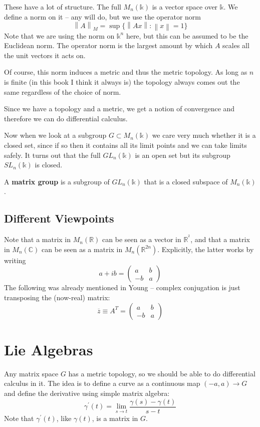 \documentclass[oneside,english]{amsbook}
\numberwithin{section}{chapter}
\theoremstyle{plain}
\theoremstyle{definition}
\newcommand{\norm}[1]{\left\lVert#1\right\rVert}
\begin{document}
These have a lot of structure. The full $M_n(\mathbb{k})$ is a vector space over $\mathbb{k}$. We define a norm on it -- any will do, but we use the operator norm
\[
	\norm{A}_M = \sup{\{\norm{Ax} : \norm{x} = 1 \}}
\]
Note that we are using the norm on $\mathbb{k}^n$ here, but this can be assumed to be the Euclidean norm. The operator norm is the largest amount by which $A$ scales all the unit vectors it acts on.

Of course, this norm induces a metric and thus the metric topology. As long as $n$ is finite (in this book I think it always is) the topology always comes out the same regardless of the choice of norm. 

Since we have a topology and a metric, we get a notion of convergence and therefore we can do differential calculus. 

Now when we look at a subgroup $G\subset M_n(\mathbb{k})$ we care very much whether it is a closed set, since if so then it contains all its limit points and we can take limits safely. It turns out that the full $GL_n(\mathbb{k})$ is an open set but its subgroup $SL_n(\mathbb{k})$ is closed.

A \textbf{matrix group} is a subgroup of $GL_n(\mathbb{k})$ that is a closed subspace of $M_n(\mathbb{k})$. 



\subsection{Different Viewpoints}

Note that a matrix in $M_n(\mathbb{R})$ can be seen as a vector in $\mathbb{R}^{^2}$, and that a matrix in $M_n(\mathbb{C})$ can be seen as a matrix in $M_n(\mathbb{R}^{2n})$. Explicitly, the latter works by writing
\[
	a + ib = \begin{pmatrix} a & b \\ -b & a \end{pmatrix}
\]
The following was already mentioned in Young -- complex conjugation is just transposing the (now-real) matrix:
\[
\overline{z} \equiv A^T = \begin{pmatrix} a & b \\ -b & a \end{pmatrix}
\]

\section{Lie Algebras}

Any matrix space $G$ has a metric topology, so we should be able to do differential calculus in it. The idea is to define a curve as a continuous map $(-a, a)\to G$ and define the derivative using simple matrix algebra:
\[
	\gamma^\prime(t) = \lim_{s\to t} \frac{\gamma(s) - \gamma(t)}{s-t}
\]
Note that $\gamma^\prime(t)$, like $\gamma(t)$, is a matrix in $G$.
\end{document}
